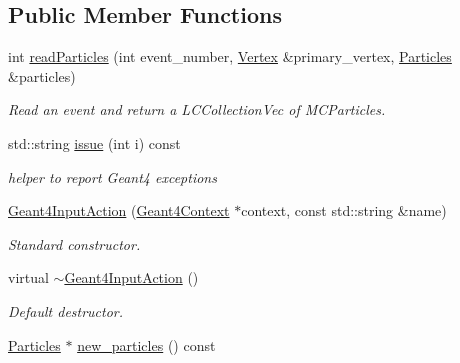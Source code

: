 \subsection*{Public Member Functions}
\begin{DoxyCompactItemize}
\item 
int \hyperlink{class_d_d4hep_1_1_simulation_1_1_geant4_input_action_ad49c027669964d9a522eb60a6cffe4c4}{readParticles} (int event\_\-number, \hyperlink{class_d_d4hep_1_1_simulation_1_1_geant4_vertex}{Vertex} \&primary\_\-vertex, \hyperlink{class_d_d4hep_1_1_simulation_1_1_geant4_input_action_ae62b1f5e1be390991dd228e7bb7bcc04}{Particles} \&particles)
\begin{DoxyCompactList}\small\item\em Read an event and return a LCCollectionVec of MCParticles. \item\end{DoxyCompactList}\item 
std::string \hyperlink{class_d_d4hep_1_1_simulation_1_1_geant4_input_action_a8a9e4f7130f7c4fe504a8124e3b461df}{issue} (int i) const 
\begin{DoxyCompactList}\small\item\em helper to report Geant4 exceptions \item\end{DoxyCompactList}\item 
\hyperlink{class_d_d4hep_1_1_simulation_1_1_geant4_input_action_a01a47921dd4a3a2d2c56fb108cbb7d6f}{Geant4InputAction} (\hyperlink{class_d_d4hep_1_1_simulation_1_1_geant4_context}{Geant4Context} $\ast$context, const std::string \&name)
\begin{DoxyCompactList}\small\item\em Standard constructor. \item\end{DoxyCompactList}\item 
virtual \hyperlink{class_d_d4hep_1_1_simulation_1_1_geant4_input_action_a82b07efc96d11b7dfacb36c718d41c26}{$\sim$Geant4InputAction} ()
\begin{DoxyCompactList}\small\item\em Default destructor. \item\end{DoxyCompactList}\item 
\hyperlink{class_d_d4hep_1_1_simulation_1_1_geant4_input_action_ae62b1f5e1be390991dd228e7bb7bcc04}{Particles} $\ast$ \hyperlink{class_d_d4hep_1_1_simulation_1_1_geant4_input_action_a02f251581f79344e42e1298ecb2812bb}{new\_\-particles} () const 

\end{DoxyCompactItemize}
